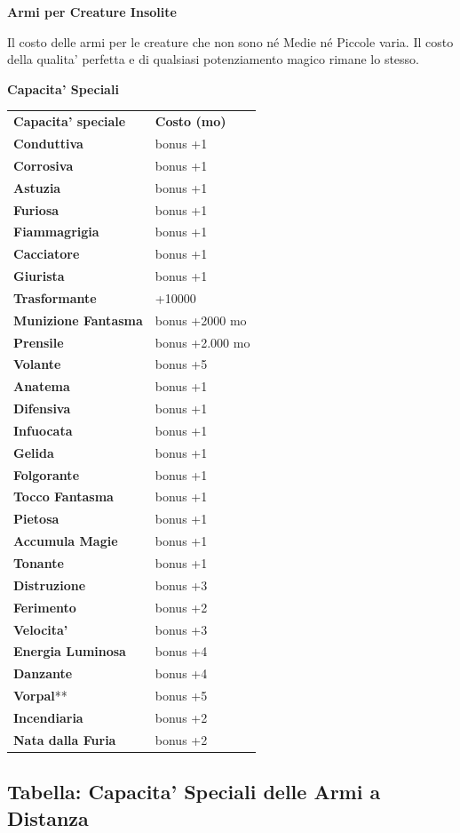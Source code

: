 \documentclass[a4paper,11pt,twoside,openany]{book}
\begin{document}
\textbf{Armi per Creature Insolite}

Il costo delle armi per le creature che non sono né Medie né Piccole varia. Il costo della qualita' perfetta e di qualsiasi potenziamento
magico rimane lo stesso.

\bigskip

\textbf{Capacita' Speciali}

\bigskip

\begin{tabular}{ll}
\toprule
\textbf{Capacita' speciale} & \textbf{Costo (mo)}\tabularnewline
\textbf{Conduttiva} \index{Conduttiva} & bonus +1\tabularnewline
\textbf{Corrosiva}\index{Corrosiva} & bonus +1\tabularnewline
\textbf{Astuzia} \index{Astuzia}& bonus +1\tabularnewline
\textbf{Furiosa} \index{Furiosa} & bonus +1\tabularnewline
\textbf{Fiammagrigia} \index{Fiammagrigia}& bonus +1\tabularnewline
\textbf{Cacciatore} \index{Cacciatore} & bonus +1\tabularnewline
\textbf{Giurista} \index{Giurista} & bonus +1\tabularnewline
\textbf{Trasformante} \index{Trasformante} & +10000\tabularnewline
\textbf{Munizione Fantasma} \index{Munizione Fantasma} & bonus +2000 mo\tabularnewline
\textbf{Prensile} \index{Prensile}& bonus +2.000 mo\tabularnewline
\textbf{Volante} \index{Volante}& bonus +5\tabularnewline
\textbf{Anatema}\index{Anatema} & bonus +1\tabularnewline
\textbf{Difensiva}\index{Difensiva} & bonus +1\tabularnewline
\textbf{Infuocata} \index{Infuocata}& bonus +1\tabularnewline
\textbf{Gelida} \index{Gelida} & bonus +1\tabularnewline
\textbf{Folgorante} \index{Folgorante} & bonus +1\tabularnewline
\textbf{Tocco Fantasma} \index{Tocco Fantasma} & bonus +1\tabularnewline
\textbf{Pietosa} \index{Pietosa} & bonus +1\tabularnewline
\textbf{Accumula Magie} \index{Accumula Magie} & bonus +1\tabularnewline
\textbf{Tonante} \index{Tonante} & bonus +1\tabularnewline
\textbf{Distruzione} \index{Distruzione}& bonus +3\tabularnewline
\textbf{Ferimento} \index{Ferimento} & bonus +2\tabularnewline
\textbf{Velocita'} \index{Velocita'} & bonus +3\tabularnewline
\textbf{Energia Luminosa} \index{Energia Luminosa}& bonus +4\tabularnewline
\textbf{Danzante} \index{Danzante} & bonus +4\tabularnewline
\textbf{Vorpal}{*}{*} \index{Vorpal} & bonus +5\tabularnewline
\textbf{Incendiaria} \index{Incendiaria} & bonus +2\tabularnewline
\textbf{Nata dalla Furia} \index{Nata dalla Furia} & bonus +2\tabularnewline

\end{tabular}

\subsection{Tabella: Capacita' Speciali delle Armi a Distanza}
\end{document}

